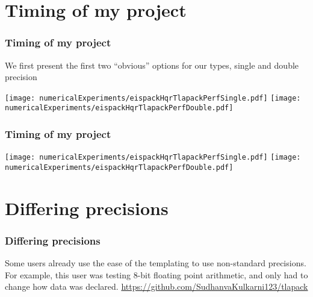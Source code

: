 \documentclass[12pt]{beamer}
\begin{document}
    \section{Timing of my project}
    \begin{frame}
        \frametitle{Timing of my project}
        We first present the first two ``obvious'' options for our types, single and double precision

        \texttt{[image: numericalExperiments/eispackHqrTlapackPerfSingle.pdf]}
        \texttt{[image: numericalExperiments/eispackHqrTlapackPerfDouble.pdf]}
    \end{frame}
    \begin{frame}
        \frametitle{Timing of my project}

        \texttt{[image: numericalExperiments/eispackHqrTlapackPerfSingle.pdf]}
        \texttt{[image: numericalExperiments/eispackHqrTlapackPerfDouble.pdf]}
    \end{frame}
    \section{Differing precisions}
    \begin{frame}
        \frametitle{Differing precisions}
        Some users already use the ease of the templating to use non-standard precisions. For example, this
        user was testing 8-bit floating point arithmetic, and only had to change how data was declared.
        \url{https://github.com/SudhanvaKulkarni123/tlapack}
    \end{frame}
\end{document}
